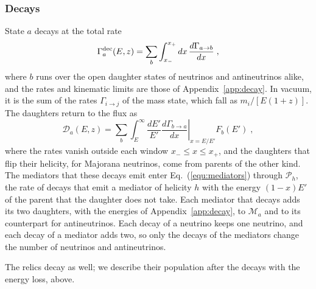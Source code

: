 \documentclass[linenumbers, aps, prd, twocolumn, superscriptaddress, floatfix, longbibliography, nofootinbib, bibnotes]{revtex4-2}
\begin{document}
\subsubsection{Decays}
State $a$ decays at the total rate
\begin{equation}
 \label{equ:decay_loss}
 \Gamma^{\rm dec}_a(E, z) = \sum_b \int_{x_-}^{x_+} dx\, \frac{d\Gamma_{a \to b}}{dx} \;,
\end{equation}
where $b$ runs over the open daughter states of neutrinos and antineutrinos alike, and the rates and kinematic limits are those of Appendix~\ref{app:decay}.
In vacuum, it is the sum of the rates $\Gamma_{i \to j}$ of the mass state, which fall as $m_i / [E(1+z)]$.
The daughters return to the flux as
\begin{equation}
 \label{equ:decay_gain}
 \mathcal{D}_a(E, z) = \sum_b \int_E^\infty \frac{dE'}{E'} \left. \frac{d\Gamma_{b \to a}}{dx} \right|_{x = E/E'} F_b(E') \;,
\end{equation}
where the rates vanish outside each window $x_- \leq x \leq x_+$, and the daughters that flip their helicity, for Majorana neutrinos, come from parents of the other kind.
The mediators that these decays emit enter Eq.~(\ref{equ:mediators}) through $\mathcal{P}_h$, the rate of decays that emit a mediator of helicity $h$ with the energy $(1 - x) E'$ of the parent that the daughter does not take.
Each mediator that decays adds its two daughters, with the energies of Appendix~\ref{app:decay}, to $\mathcal{M}_a$ and to its counterpart for antineutrinos.
Each decay of a neutrino keeps one neutrino, and each decay of a mediator adds two, so only the decays of the mediators change the number of neutrinos and antineutrinos.

The relics decay as well; we describe their population after the decays with the energy loss, above.
\end{document}
